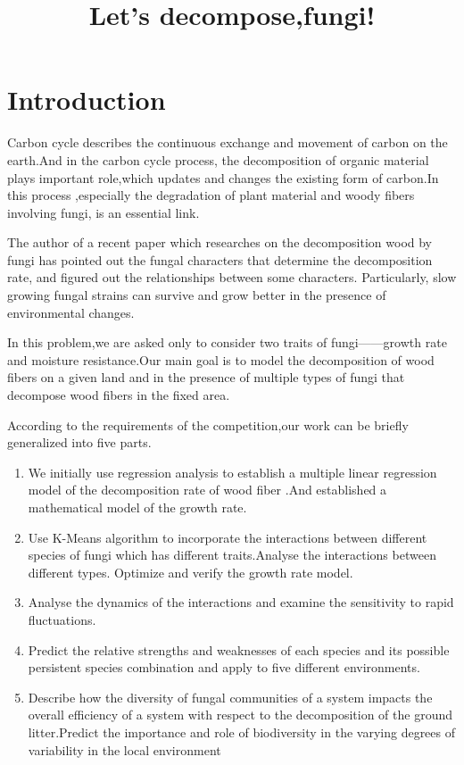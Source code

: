 \documentclass[12pt]{article}
\title{Let's decompose,fungi!}  %
\begin{document}

\section{Introduction}
Carbon cycle describes the continuous exchange and movement of carbon on the earth.And in the carbon cycle process, the decomposition of organic material plays important role,which updates and changes the existing form of carbon.In this process ,especially the degradation of plant material and woody fibers involving fungi, is an essential link. \par 

The author of a recent paper which researches on the decomposition wood by fungi has pointed out  the fungal characters that determine the decomposition rate, and figured out the relationships between some characters. Particularly, slow growing fungal strains can survive and grow better in the presence of environmental changes.\par 

In this problem,we are asked only to consider two traits of fungi——growth rate and moisture resistance.Our main goal is to model the decomposition of wood fibers on a given land and in the presence of multiple types of fungi that decompose wood fibers in the fixed area.\par 
According to the requirements of the competition,our work can be briefly generalized into five parts.\par 

\begin{enumerate}[\bfseries 1.]	
	\item We initially use regression analysis to establish a multiple linear regression model of the decomposition rate of wood fiber .And established a mathematical model of the growth rate.
	
	\item Use K-Means algorithm to incorporate the interactions between different species of fungi which has different traits.Analyse the interactions between different types. Optimize and verify the growth rate model.
	
	\item Analyse the dynamics of the interactions and examine the sensitivity to rapid fluctuations.
	
	\item Predict the relative strengths and weaknesses of each species and its possible persistent species combination and apply to five different environments.
	
	\item Describe how the diversity of fungal communities of a system impacts the overall efficiency of a system with respect to the decomposition of the ground litter.Predict the importance and role of biodiversity in the varying degrees of variability in the local environment
\end{enumerate}\par
\end{document}
